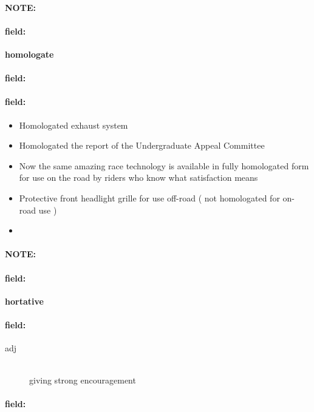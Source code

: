 \documentclass[12pt]{article}
\newenvironment{note}{\paragraph{NOTE:}}{}
\newenvironment{field}{\paragraph{field:}}{}
\begin{document}
\begin{note}
\begin{field}
\textbf{\large homologate}
\end{field}


\begin{field}
\end{field}

\begin{field}
\begin{itemize}
\item Homologated exhaust system
\item Homologated the report of the Undergraduate Appeal Committee
\item Now the same amazing race technology is available in fully homologated form for use on the road by riders who know what satisfaction means
\item Protective front headlight grille for use off-road ( not homologated for on-road use )
\item 
\end{itemize}
\end{field}
\end{note}
\begin{note}
\begin{field}
\textbf{\large hortative}
\end{field}


\begin{field}
\begin{description}
\item[adj] \hfill \\ 
giving strong encouragement

\end{description}
\end{field}

\begin{field}
\end{field}
\end{note}
\end{document}
